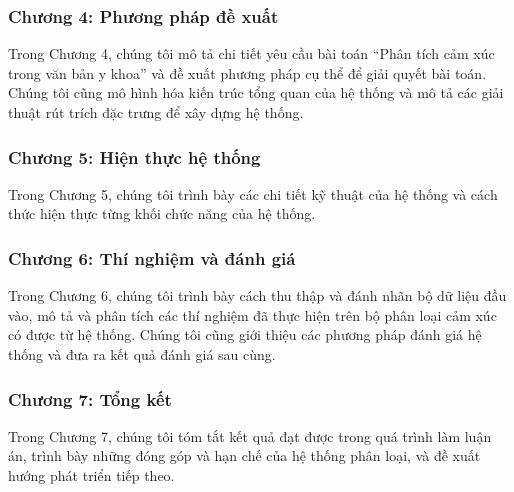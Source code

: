 \subsubsection*{Chương 4: Phương pháp đề xuất}
Trong Chương 4, chúng tôi mô tả chi tiết yêu cầu bài toán ``Phân tích cảm xúc trong văn bản y khoa'' và đề xuất phương pháp cụ thể để giải quyết bài toán. Chúng tôi cũng mô hình hóa kiến trúc tổng quan của hệ thống và mô tả các giải thuật rút trích đặc trưng để xây dựng hệ thống.
\subsubsection*{Chương 5: Hiện thực hệ thống}
Trong Chương 5, chúng tôi trình bày các chi tiết kỹ thuật của hệ thống và cách thức hiện thực từng khối chức năng của hệ thống.
\subsubsection*{Chương 6: Thí nghiệm và đánh giá}
Trong Chương 6, chúng tôi trình bày cách thu thập và đánh nhãn bộ dữ liệu đầu vào, mô tả và phân tích các thí nghiệm đã thực hiện trên bộ phân loại cảm xúc có được từ hệ thống. Chúng tôi cũng giới thiệu các phương pháp đánh giá hệ thống và đưa ra kết quả đánh giá sau cùng.
\subsubsection*{Chương 7: Tổng kết}
Trong Chương 7, chúng tôi tóm tắt kết quả đạt được trong quá trình làm luận án, trình bày những đóng góp và hạn chế của hệ thống phân loại, và đề xuất hướng phát triển tiếp theo.
